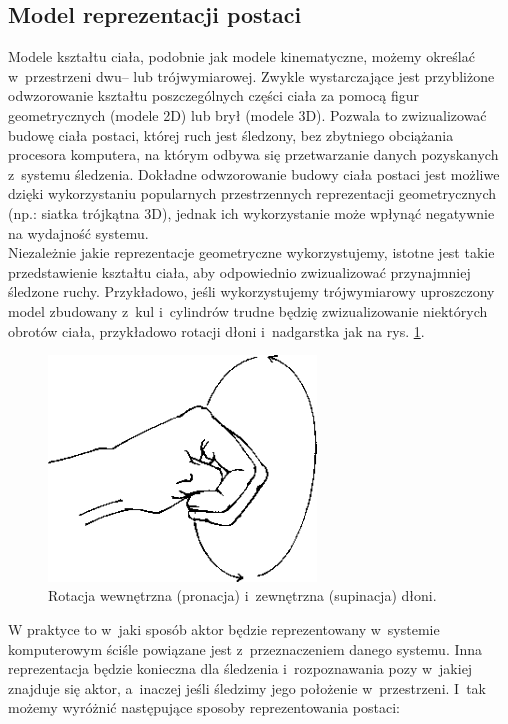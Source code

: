 \subsection{Model reprezentacji postaci}
Modele kształtu ciała, podobnie jak modele kinematyczne, możemy określać w~przestrzeni dwu-- lub trójwymiarowej. Zwykle wystarczające jest przybliżone odwzorowanie kształtu poszczególnych części ciała za pomocą figur geometrycznych (modele 2D) lub brył (modele 3D). Pozwala to zwizualizować budowę ciała postaci, której ruch jest śledzony, bez zbytniego obciążania procesora komputera, na którym odbywa się przetwarzanie danych pozyskanych z~systemu śledzenia. Dokładne odwzorowanie budowy ciała postaci jest możliwe dzięki wykorzystaniu popularnych przestrzennych reprezentacji geometrycznych (np.: siatka trójkątna 3D), jednak ich wykorzystanie może wpłynąć negatywnie na wydajność systemu. \\
Niezależnie jakie reprezentacje geometryczne wykorzystujemy, istotne jest takie przedstawienie kształtu ciała, aby odpowiednio zwizualizować przynajmniej śledzone ruchy. Przykładowo, jeśli wykorzystujemy trójwymiarowy uproszczony model zbudowany z~kul i~cylindrów trudne będzię zwizualizowanie niektórych obrotów ciała, przykładowo rotacji dłoni i~nadgarstka jak na rys. \ref{fig:literature:wristRotation}.\\
															
\begin{savenotes}
	\begin{figure}[!htp]
		\centering	
		\includegraphics[height=6cm]{images/Wrist_joint_rotation.png}
		\caption{Rotacja wewnętrzna (pronacja) i~zewnętrzna (supinacja) dłoni.}	
		\label{fig:literature:wristRotation}
	\end{figure}
\end{savenotes}
															
W praktyce to w~jaki sposób aktor będzie reprezentowany w~systemie komputerowym ściśle powiązane jest z~przeznaczeniem danego systemu. Inna reprezentacja będzie konieczna dla śledzenia i~rozpoznawania pozy w~jakiej znajduje się aktor, a~inaczej jeśli śledzimy jego położenie w~przestrzeni. I~tak możemy wyróżnić następujące sposoby reprezentowania postaci:
																
